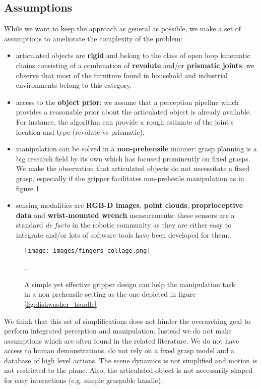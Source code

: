 \subsection{Assumptions} 

While we want to keep the approach as general as possible, we make a set of assumptions to ameliorate the complexity of the problem:  
\begin{itemize}
\item articulated objects are \textbf{rigid} and belong to the class of open loop kinematic chains consisting of a combination of \textbf{revolute} and/or \textbf{prismatic joints}: we observe that most of the furniture found in household and industrial environments belong to this category.  
\item access to the \textbf{object prior}: we assume that a perception pipeline which provides a reasonable prior about the articulated object is already available. For instance, the algorithm can provide a rough estimate of the joint's location and type (revolute vs prismatic). 
\item manipulation can be solved in a \textbf{non-prehensile} manner: grasp planning is a big research field by its own which has focused prominently on fixed grasps. We make the observation that articulated objects do not necessitate a fixed grasp, especially if the gripper facilitates non-prehesile manipulation as in figure \ref{fig:hook_gripper} 
\item sensing modalities are \textbf{RGB-D images}, \textbf{point clouds}, \textbf{proprioceptive data} and \textbf{wrist-mounted wrench} measurements: these sensors are a standard \emph{de facto} in the robotic community as they are either easy to integrate and/or lots of software tools have been developed for them.
\end{itemize}

\begin{figure}[h!]
    \centering
    \texttt{[image: images/fingers\_collage.png]}
    \caption{A simple yet effective gripper design can help the manipulation task in a non prehensile setting as the one depicted in figure \ref{fig:dishwasher_handle}}.
    \label{fig:hook_gripper}
\end{figure}

We think that this set of simplifications does not hinder the overarching goal to perform integrated perception and manipulation. Instead we do not make assumptions which are often found in the related literature. We do not have access to human demonstrations, do not rely on a fixed grasp model and a database of high level actions. The scene dynamics is not simplified and motion is not restricted to the plane. Also, the articulated object is not necessarily shaped for easy interactions (e.g. simple graspable handle). 

